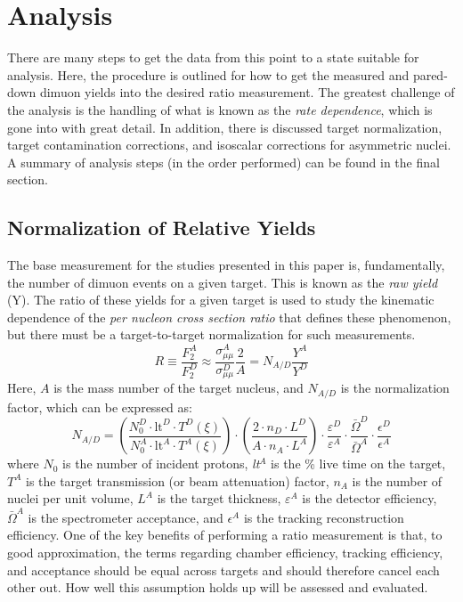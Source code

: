 \chapter{Analysis}

There are many steps to get the data from this point to a state suitable for analysis. Here, the procedure is outlined for how to get the measured and pared-down dimuon yields into the desired ratio measurement. The greatest challenge of the analysis is the handling of what is known as the \emph{rate dependence}, which is gone into with great detail. In addition, there is discussed target normalization, target contamination corrections, and isoscalar corrections for asymmetric nuclei. A summary of analysis steps (in the order performed) can be found in the final section.

\section{Normalization of Relative Yields}\label{sec:targ-to-targ-norm}

The base measurement for the studies presented in this paper is, fundamentally, the number of dimuon events on a given target. This is known as the \emph{raw yield} (Y). The ratio of these yields for a given target is used to study the kinematic dependence of the \emph{per nucleon cross section ratio} that defines these phenomenon, but there must be a target-to-target normalization for such measurements.
\begin{equation}
R \equiv \frac{F_2^A}{F_2^D} \approx \frac{\sigma_{\mu\mu}^A}{\sigma_{\mu\mu}^D} \frac{2}{A} = N_{A/D} \frac{Y^A}{Y^D}
\label{eq:dy-ratio}
\end{equation}
Here, $A$ is the mass number of the target nucleus, and $N_{A/D}$ is the normalization factor, which can be expressed as:
\begin{equation}
	N_{A/D} =
		\left(\frac{ N_0^D \cdot \text{lt}^D \cdot T^D(\xi)}{N_0^A \cdot \text{lt}^A \cdot T^A(\xi) } \right) \cdot 
		\left( \frac{ 2 \cdot n_D \cdot L^D }{ A \cdot n_A \cdot L^A } \right) \cdot 
		\frac{ \varepsilon^D }{ \varepsilon^A }  \cdot 
		\frac{ \bar{\Omega}^D }{\bar{ \Omega}^A } \cdot 
		\frac{ \epsilon^D }{ \epsilon^A } \label{eq:targ-to-targ-norm}
\end{equation}
where $N_0$ is the number of incident protons, \emph{lt}$^A$ is the \% live time on the target, $T^A$ is the target transmission (or beam attenuation) factor, $n_A$ is the number of nuclei per unit volume, $L^A$ is the target thickness, $\varepsilon^A$ is the detector efficiency, $\bar{\Omega}^A$ is the spectrometer acceptance, and $\epsilon^A$ is the tracking reconstruction efficiency. One of the key benefits of performing a ratio measurement is that, to good approximation, the terms regarding chamber efficiency, tracking efficiency, and acceptance should be equal across targets and should therefore cancel each other out. How well this assumption holds up will be assessed and evaluated.

